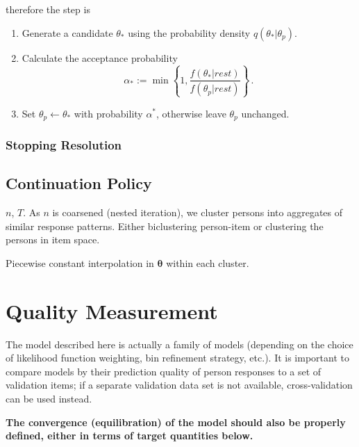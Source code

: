 \documentclass{article}
\newcommand{\ta}{\theta}
\newcommand{\bta}{\boldsymbol\ta}
\begin{document}
therefore the step is
\begin{enumerate}
	\item Generate a candidate $\ta_*$ using the probability density $q(\ta_*|\ta_p)$.
	\item Calculate the acceptance probability
	\begin{equation}
		\alpha_* := \min\left\{1, \frac{f(\ta_*|rest)}{f(\ta_p|rest)} \right\}\,.
	\end{equation}
	\item Set $\ta_p \leftarrow \ta_*$ with probability $\alpha^*$, otherwise leave $\ta_p$ unchanged.
\end{enumerate}


\subsubsection{Stopping Resolution}

\subsection{Continuation Policy}
$n$, $T$. As $n$ is coarsened (nested iteration), we cluster persons into aggregates of similar
response patterns. Either biclustering person-item or clustering the persons in item space.


Piecewise constant interpolation in $\bta$ within each cluster.

\section{Quality Measurement}
The model described here is actually a family of models (depending on the choice of likelihood function weighting, bin refinement strategy, etc.). It is important to compare models by their prediction quality of
person responses to a set of validation items; if a separate validation data set is not available, cross-validation can be used instead.

{\bf The convergence (equilibration) of the model should also be properly defined, either in terms of target quantities below.}
\end{document}
